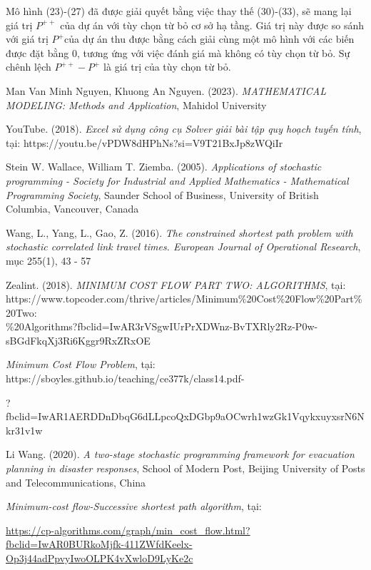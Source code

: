 \documentclass[a4paper]{article}
\begin{document}
\begin{itemize}
        Mô hình (23)-(27) đã được giải quyết bằng việc thay thế (30)-(33), sẽ mang lại giá trị $P^{++}$ của dự án với tùy chọn từ bỏ cơ sở hạ tầng.
        Giá trị này được so sánh với giá trị $P^+$của dự án thu được bằng cách giải cùng một mô hình với các biến được đặt bằng 0, tương ứng với việc đánh giá mà không có tùy chọn từ bỏ.
        Sự chênh lệch $P^{++} - P^+$ là giá trị của tùy chọn từ bỏ.

    \end{itemize}

\begin{thebibliography}{80}


Man Van Minh Nguyen, Khuong An Nguyen. (2023). \textit{MATHEMATICAL MODELING: Methods and Application}, Mahidol University


YouTube. (2018). \textit{Excel sử dụng công cụ Solver giải bài tập quy hoạch tuyến tính}, tại: https://youtu.be/vPDW8dHPhNs?si=V9T21BxJp8zWQiIr

Stein W. Wallace, William T. Ziemba. (2005). \textit{Applications of stochastic programming - Society for Industrial and Applied Mathematics -  Mathematical Programming Society}, Saunder School of Business, University of British Columbia, Vancouver, Canada

Wang, L., Yang, L., Gao, Z. (2016). \textit{The constrained shortest path problem with stochastic correlated link travel times. European Journal of Operational Research}, mục 255(1), 43 - 57

Zealint. (2018). \textit{MINIMUM COST FLOW PART TWO: ALGORITHMS}, tại: https://www.topcoder.com/thrive/articles/Minimum\%20Cost\%20Flow\%20Part\%20Two:\\
\%20Algorithms?fbclid=IwAR3rVSgwIUrPrXDWnz-BvTXRly2Rz-P0w-sBGdFkqXj3Ri6Kggr9RxZRxOE

\textit{Minimum Cost Flow Problem}, tại: https://sboyles.github.io/teaching/ce377k/class14.pdf-

?fbclid=IwAR1AERDDnDbqG6dLLpcoQxDGbp9aOCwrh1wzGk1VqykxuyxsrN6Nkr31v1w


Li Wang. (2020). \textit{A two-stage stochastic programming framework for evacuation planning in
disaster responses}, School of Modern Post, Beijing University of Posts and Telecommunications, China

\textit{Minimum-cost flow-Successive shortest path algorithm}, tại:

\url{https://cp-algorithms.com/graph/min_cost_flow.html?fbclid=IwAR0BURkoMjfk-411ZWfdKeelx-Op3j44adPpvyIwoOLPK4vXwloD9LyKe2c}

\end{thebibliography}
\end{document}
